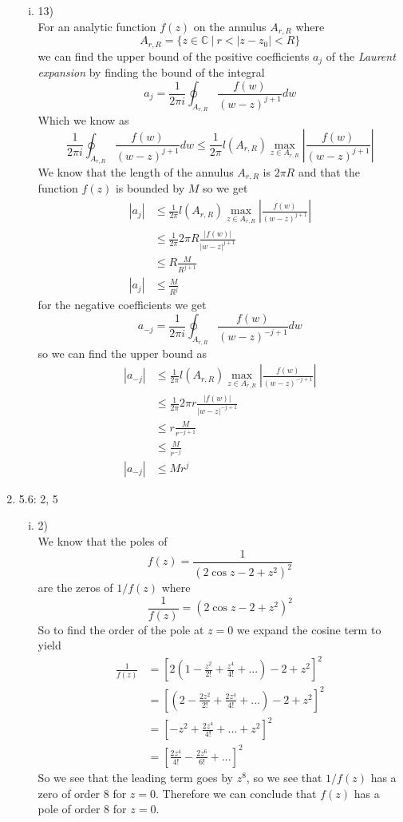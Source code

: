 \documentclass[11pt]{article}
\newcommand{\CC}{\mathbb{C}}
\begin{document}
\begin{enumerate}
\begin{enumerate}[(i)]
\item 13)\\
For an analytic function $f(z)$ on the annulus $A_{r,R}$ where 
$$A_{r,R} = \{z\in\CC\ |\ r<|z-z_0|<R\}$$
we can find the upper bound of the positive coefficients $a_j$ of the \emph{Laurent expansion} by finding the bound of the integral 
$$a_j = \frac{1}{2\pi i}\oint_{A_{r,R}}\frac{f(w)}{(w-z)^{j+1}}dw$$
Which we know as 
$$\frac{1}{2\pi i}\oint_{A_{r,R}}\frac{f(w)}{(w-z)^{j+1}}dw \le \frac{1}{2\pi}l(A_{r,R})\max_{z\in A_{r,R}}\left|\frac{f(w)}{(w-z)^{j+1}}\right|$$
We know that the length of the annulus $A_{r,R}$ is $2\pi R$ and that the function $f(z)$ is bounded by $M$ so we get
\begin{align*}
|a_j| &\le \frac{1}{2\pi}l(A_{r,R})\max_{z\in A_{r,R}}\left|\frac{f(w)}{(w-z)^{j+1}}\right|\\
&\le \frac{1}{2\pi}2\pi R\frac{|f(w)|}{|w-z|^{j+1}}\\
&\le R\frac{M}{R^{j+1}}\\
|a_j| &\le \frac{M}{R^j}
\end{align*}
for the negative coefficients we get
$$a_{-j} = \frac{1}{2\pi i}\oint_{A_{r,R}}\frac{f(w)}{(w-z)^{-j+1}}dw$$
so we can find the upper bound as
\begin{align*}
|a_{-j}| &\le \frac{1}{2\pi}l(A_{r,R})\max_{z\in A_{r,R}}\left|\frac{f(w)}{(w-z)^{-j+1}}\right|\\
&\le \frac{1}{2\pi}2\pi r \frac{|f(w)|}{|w-z|^{-j+1}}\\
&\le  r \frac{M}{r^{-j+1}}\\
&\le  \frac{M}{r^{-j}}\\
|a_{-j}| &\le  {M}{r^{j}}
\end{align*}


\end{enumerate}
\item 5.6: 2, 5 
\begin{enumerate}[(i)]
\item 2)\\
We know that the poles of 
$$f(z) = \frac{1}{\left(2\cos z-2+z^2\right)^2}$$
are the zeros of $1/f(z)$ where
$$\frac{1}{f(z)} = (2\cos z-2+z^2)^2$$
So to find the order of the pole at $z=0$ we expand the cosine term to yield
\begin{align*}
\frac{1}{f(z)} &= \left[2\left(1-\frac{z^2}{2!}+\frac{z^4}{4!}+...\right)-2+z^2\right]^2\\
&= \left[\left(2-\frac{2z^2}{2!}+\frac{2z^4}{4!}+...\right)-2+z^2\right]^2\\
&= \left[-z^2+\frac{2z^4}{4!}+...+z^2\right]^2\\
&= \left[\frac{2z^4}{4!}-\frac{2z^6}{6!}+...\right]^2
\end{align*}
So we see that the leading term goes by $z^8$, so we see that $1/f(z)$ has a zero of order 8 for $z=0$. Therefore we can conclude that $f(z)$ has a pole of order 8 for $z=0$.


\end{enumerate}
\end{enumerate}
\end{document}
